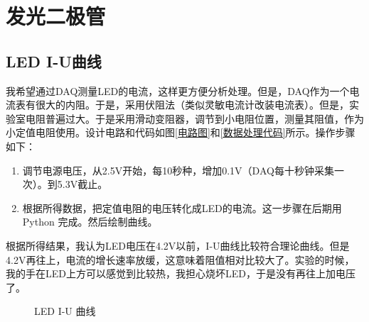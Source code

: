 \documentclass[UTF8]{ctexart}
\begin{document}
\section{发光二极管}
\subsection{LED I-U曲线}
我希望通过DAQ测量LED的电流，这样更方便分析处理。但是，DAQ作为一个电流表有很大的内阻。于是，采用伏阻法（类似灵敏电流计改装电流表）。但是，实验室电阻普遍过大。于是采用滑动变阻器，调节到小电阻位置，测量其阻值，作为小定值电阻使用。设计电路和代码如图\ref{电路图}和\ref{数据处理代码}所示。操作步骤如下：
\begin{enumerate}
    \item 调节电源电压，从2.5V开始，每10秒种，增加0.1V（DAQ每十秒钟采集一次）。到5.3V截止。
    \item 根据所得数据，把定值电阻的电压转化成LED的电流。这一步骤在后期用Python 完成。然后绘制曲线。

\end{enumerate}

根据所得结果，我认为LED电压在4.2V以前，I-U曲线比较符合理论曲线。但是4.2V再往上，电流的增长速率放缓，这意味着阻值相对比较大了。实验的时候，我的手在LED上方可以感觉到比较热，我担心烧坏LED，于是没有再往上加电压了。
\begin{figure}
\centering  %
\caption{LED I-U 曲线}
\end{figure}
\end{document}
